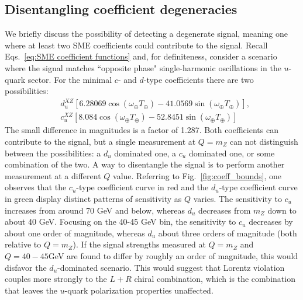 \subsection{Disentangling coefficient degeneracies}
\label{ssec:disentangle}

We briefly discuss the possibility of detecting a degenerate signal,
meaning one where at least two SME coefficients
could contribute to the signal.
Recall Eqs.~\eqref{eq:SME coefficient functions} and, for definiteness,
consider a scenario where the signal matches ``opposite phase" 
single-harmonic oscillations in the $u$-quark sector. 
For the minimal $c$- and $d$-type 
coefficients there are two possibilities:
\begin{align}
&d_u^{XZ}\left[6.28069\cos(\omega_\oplus T_\oplus)
-41.0569 \sin(\omega_\oplus T_\oplus)\right], \nonumber \\
&c_u^{XZ}\left[8.084\cos(\omega_\oplus T_\oplus)
-52.8451 \sin(\omega_\oplus T_\oplus)\right]
\end{align}
The small difference in magnitudes is a factor of 1.287.
Both coefficients can contribute to the signal, but 
a single measurement at $Q=m_Z$ can 
not distinguish between the possibilities: a $d_u$ dominated one, 
a $c_u$ dominated one, or some combination of the two.
A way to disentangle the signal 
is to perform another measurement at a different $Q$ value.
Referring to Fig.~\ref{fig:coeff_bounds}, one observes
that the $c_u$-type coefficient curve in red and
the $d_u$-type coefficient curve in green display distinct
patterns of sensitivity as $Q$ varies. 
The sensitivity to $c_u$ increases from around 
70 GeV and below, whereas $d_u$ 
decreases from $m_Z$ down to about 40 GeV. 
Focusing on the 40-45 GeV bin, the sensitivity
to $c_u$ decreases by about one order of magnitude, 
whereas $d_u$ about three orders of magnitude (both relative to $Q=m_Z$).
If the signal strengths measured at $Q=m_Z$ 
and $Q=40-45$\;GeV are found to differ by roughly an order of magnitude, 
this would disfavor the $d_u$-dominated scenario. This would suggest
that Lorentz violation couples more strongly 
to the $L+R$ chiral combination, which is the combination
that leaves the $u$-quark polarization properties unaffected.


